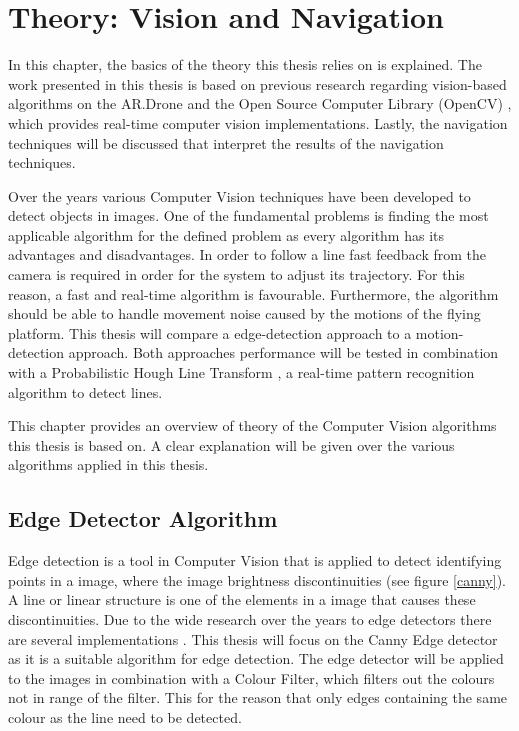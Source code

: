 \documentclass[a4paper]{article}
\begin{document}
\newpage
\section{Theory: Vision and Navigation}
In this chapter, the basics of the theory this thesis relies on is explained. The work presented in this thesis is based on previous research regarding vision-based algorithms on the AR.Drone \cite{Jurriaans2011} and the Open Source Computer Library (OpenCV) \cite{Bradski2008}, which provides real-time computer vision implementations. Lastly, the navigation techniques will be discussed that interpret the results of the navigation techniques.

Over the years various Computer Vision techniques have been developed to detect objects in images. One of the fundamental problems is finding the most applicable algorithm for the defined problem as every algorithm has its advantages and disadvantages. In order to follow a line fast feedback from the camera is required in order for the system to adjust its trajectory. For this reason, a fast and real-time algorithm is favourable. Furthermore, the algorithm should be able to handle movement noise caused by the motions of the flying platform. This thesis will compare a edge-detection approach to a motion-detection approach. Both approaches performance will be tested in combination with a Probabilistic Hough Line Transform \cite{Kiryati1991}, a real-time pattern recognition algorithm to detect lines.

This chapter provides an overview of theory of the Computer Vision algorithms this thesis is based on. A clear explanation will be given over the various algorithms applied in this thesis.

\subsection{Edge Detector Algorithm}
Edge detection is a tool in Computer Vision that is applied to detect identifying points in a image, where the image brightness discontinuities (see figure \ref{canny}). A line or linear structure is one of the elements in a image that causes these discontinuities. Due to the wide research over the years to edge detectors there are several implementations \cite{Ziou1998}. This thesis will focus on the Canny Edge detector as it is a suitable algorithm for edge detection. The edge detector will be applied to the images in combination with a Colour Filter, which filters out the colours not in range of the filter. This for the reason that only edges containing the same colour as the line need to be detected.
\end{document}
